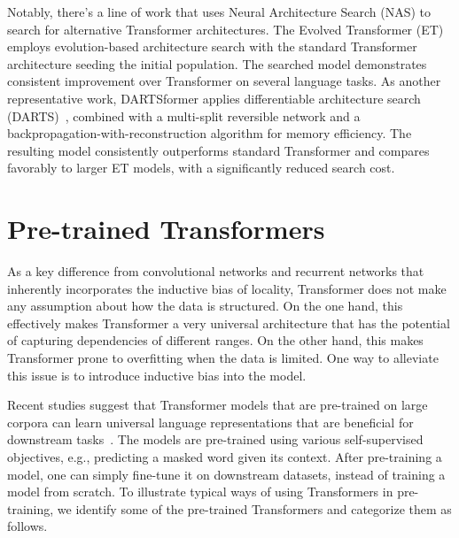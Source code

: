 \documentclass[manuscript,acmsmall,screen,nonacm]{acmart}
\theoremstyle{definition}
\begin{document}
Notably, there's a line of work that uses Neural Architecture Search (NAS) to search for alternative Transformer architectures. The Evolved Transformer (ET)~\cite{so19evolvedxformer} employs evolution-based architecture search with the standard  Transformer architecture seeding the initial population. The searched model demonstrates consistent improvement
over Transformer on several language tasks. As another representative work, DARTSformer\cite{zhao2021dartsformer} applies differentiable architecture search (DARTS)~\cite{liu2018darts}, combined with a multi-split reversible network and a backpropagation-with-reconstruction algorithm for memory efficiency. The resulting model consistently outperforms standard Transformer and compares favorably to larger ET models, with a significantly reduced search cost.


\section{Pre-trained Transformers}\label{sec:ptm}
As a key difference from convolutional networks and recurrent networks that inherently incorporates the inductive bias of locality, Transformer does not make any assumption about how the data is structured. On the one hand, this effectively makes Transformer a very universal architecture that has the potential of capturing dependencies of different ranges. On the other hand, this makes Transformer prone to overfitting when the data is limited. One way to alleviate this issue is to introduce inductive bias into the model.

Recent studies suggest that Transformer models that are pre-trained on large corpora can learn universal language representations that are beneficial for downstream tasks~\cite{qiu2020ptms}. The models are pre-trained using various self-supervised objectives, e.g., predicting a masked word given its context. After pre-training a model, one can simply fine-tune it on downstream datasets, instead of training a model from scratch. To illustrate typical ways of using Transformers in pre-training, we identify some of the pre-trained Transformers and categorize them as follows.
\end{document}
